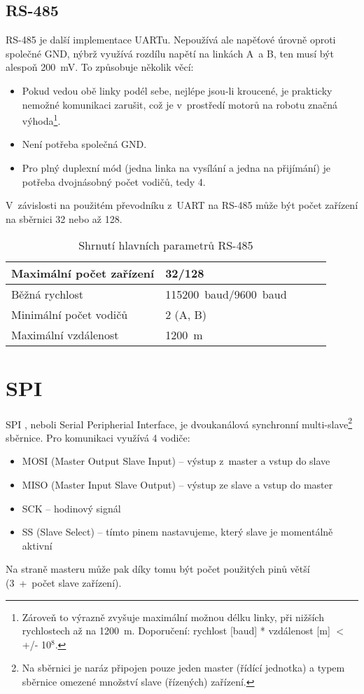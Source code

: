 \subsection{RS-485}\label{RS-485} %
RS-485 \cite{RS-485} je další implementace UARTu.
Nepoužívá ale napěťové úrovně oproti společné GND, nýbrž využívá rozdílu napětí na linkách A~a B, ten musí být alespoň 200~mV.
To způsobuje několik věcí:
\begin{itemize}
	\item Pokud vedou obě linky podél sebe, nejlépe jsou-li kroucené, je prakticky nemožné komunikaci zarušit, což je v~prostředí motorů na robotu značná výhoda\footnote{Zároveň to výrazně zvyšuje maximální možnou délku linky, při nižších rychlostech až na 1200~m. Doporučení: rychlost [baud] * vzdálenost [m] $<$ +/- 10$^{8}$.}.  
	\item Není potřeba společná GND.
	\item Pro plný duplexní mód (jedna linka na vysílání a jedna na přijímání) je potřeba dvojnásobný počet vodičů, tedy 4.
\end{itemize}
V~závislosti na použitém převodníku z~UART na RS-485 může být počet zařízení na sběrnici 32 nebo až 128.
\begin{table}[h]
		
	\centering
	\begin{tabular}{|l|l|l|l|l|} \hline
		Maximální počet zařízení & 32/128                \\ \hline
		Běžná rychlost              & 115200~baud/9600~baud \\ \hline
		Minimální počet vodičů    & 2 (A, B)              \\ \hline
		Maximální vzdálenost        & 1200~m                \\ \hline
	\end{tabular}
	\caption{Shrnutí hlavních parametrů RS-485}
\end{table}

\section{SPI}
SPI \cite{nxp:AN2847}, neboli Serial Peripherial Interface, je dvoukanálová synchronní multi-slave\footnote{Na sběrnici je naráz připojen pouze jeden master (řídící jednotka) a typem sběrnice omezené množství slave (řízených) zařízení.} sběrnice.
Pro komunikaci využívá 4 vodiče:
\begin{itemize}
	\item MOSI (Master Output Slave Input) -- výstup z~master a vstup do slave
	\item MISO (Master Input Slave Output) -- výstup ze slave a vstup do master
	\item SCK -- hodinový signál
	\item SS (Slave Select) -- tímto pinem nastavujeme, který slave je momentálně aktivní
\end{itemize}
Na straně masteru může pak díky tomu být počet použitých pinů větší (3~+~počet slave zařízení).

